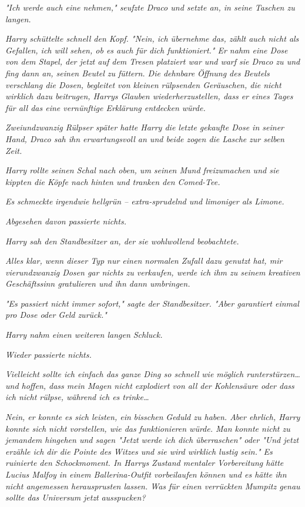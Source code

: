 {\emph{"Ich werde auch eine nehmen," seufzte Draco und setzte an, in seine Taschen zu langen.}

\emph{Harry schüttelte schnell den Kopf. "Nein, ich übernehme das, zählt auch nicht als Gefallen, ich will sehen, ob es auch für dich funktioniert." Er nahm eine Dose von dem Stapel, der jetzt auf dem Tresen platziert war und warf sie Draco zu und fing dann an, seinen Beutel zu füttern. Die dehnbare Öffnung des Beutels verschlang die Dosen, begleitet von kleinen rülpsenden Geräuschen, die nicht wirklich dazu beitrugen, Harrys Glauben wiederherzustellen, dass er eines Tages für all das eine vernünftige Erklärung entdecken würde.}

\emph{Zweiundzwanzig Rülpser später hatte Harry die letzte gekaufte Dose in seiner Hand, Draco sah ihn erwartungsvoll an und beide zogen die Lasche} \emph{zur selben Zeit.}

\emph{Harry rollte seinen Schal nach oben, um seinen Mund freizumachen und sie kippten die Köpfe nach hinten und tranken den Comed-Tee.}

\emph{Es} \emph{\emph{schmeckte}} \emph{irgendwie hellgrün -- extra-sprudelnd und limoniger als Limone.}

\emph{Abgesehen davon passierte nichts.}

\emph{Harry sah den Standbesitzer an, der sie wohlwollend beobachtete.}

\emph{\emph{Alles klar, wenn dieser Typ nur einen normalen Zufall dazu genutzt hat, mir vierundzwanzig Dosen gar nichts zu verkaufen, werde ich ihm zu seinem kreativen Geschäftssinn gratulieren und ihn dann umbringen.}}

\emph{"Es passiert nicht immer sofort," sagte der Standbesitzer. "Aber garantiert einmal pro Dose oder Geld zurück."}

\emph{Harry nahm einen weiteren langen Schluck.}

\emph{Wieder passierte nichts.}

\emph{\emph{Vielleicht sollte ich einfach das ganze Ding so schnell wie möglich runterstürzen… und hoffen, dass mein Magen nicht explodiert von all der Kohlensäure oder dass ich nicht rülpse, während ich es trinke…}}

\emph{Nein, er konnte es sich leisten, ein} \emph{\emph{bisschen}} \emph{Geduld zu haben. Aber ehrlich, Harry konnte sich nicht vorstellen, wie das funktionieren würde. Man konnte nicht zu jemandem hingehen und sagen "Jetzt werde ich dich überraschen" oder "Und jetzt erzähle ich dir die Pointe des Witzes und sie wird wirklich lustig sein." Es ruinierte den Schockmoment. In Harrys Zustand mentaler Vorbereitung hätte Lucius Malfoy in einem Ballerina-Outfit vorbeilaufen können und es hätte ihn nicht angemessen herausprusten lassen. Was für einen verrückten Mumpitz genau sollte das Universum} \emph{\emph{jetzt}} \emph{ausspucken?}

}

